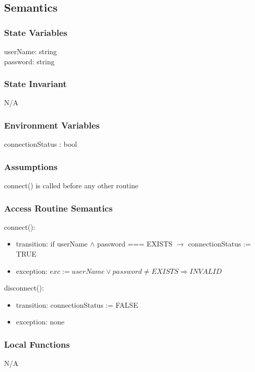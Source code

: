 \documentclass[12pt, titlepage]{article}
\begin{document}
\subsection{Semantics}

\subsubsection{State Variables}

userName: string \\
password: string

\subsubsection{State Invariant}

N/A

\subsubsection{Environment Variables}
connectionStatus : bool

\subsubsection{Assumptions}
connect() is called before any other routine

\subsubsection{Access Routine Semantics}
\noindent connect():
\begin{itemize}
\item transition: if userName $\land$ password === EXISTS $\rightarrow$ connectionStatus := TRUE
\item exception: $exc:= userName \lor password \ne EXISTS \Rightarrow INVALID$
\end{itemize}

\noindent disconnect():
\begin{itemize}
  \item transition: connectionStatus := FALSE
\item exception: none
\end{itemize}

\subsubsection{Local Functions}

N/A
\end{document}
